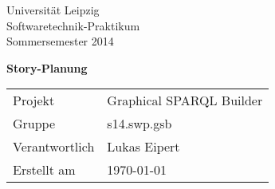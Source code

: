 \def\verantwortlicher{Lukas Eipert} %
\thispagestyle{empty} 

\vspace*{2\baselineskip}

\begin{center}
\sffamily
Universität Leipzig\\
Softwaretechnik-Praktikum\\
Sommersemester 2014
\baselineskip

\bgroup
\Huge\textbf{Story-Planung}
\egroup
{}\baselineskip

\begin{tabular}{ll}
Projekt & Graphical SPARQL Builder \\
Gruppe & s14.swp.gsb \\
Verantwortlich & \verantwortlicher\\
Erstellt am & \today \\
\end{tabular}
\end{center}

\vfill

